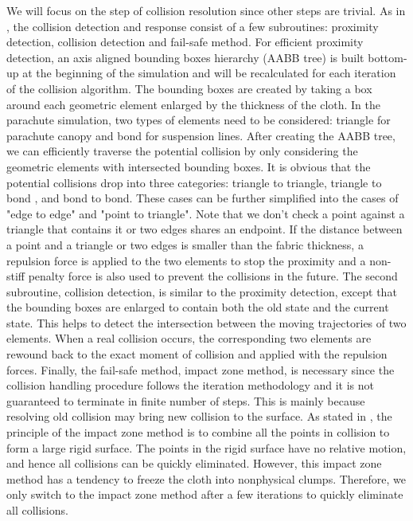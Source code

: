 We will focus on the step of collision resolution since other steps are trivial. As in \cite{Bridson02}, the collision detection and response consist of a few subroutines: proximity detection, collision detection and fail-safe method. For efficient proximity detection, an axis aligned bounding boxes hierarchy (AABB tree) is built bottom-up at the beginning of the simulation and will be recalculated for each iteration of the collision algorithm. The bounding boxes are created by taking a box around each geometric element enlarged by the thickness of the cloth. In the parachute simulation, two types of elements need to be considered: triangle for parachute canopy and bond for suspension lines. After creating the AABB tree, we can efficiently traverse the potential collision by only considering the geometric elements with intersected bounding boxes. It is obvious that the potential collisions drop into three categories: triangle to triangle, triangle to bond , and bond to bond. These cases can be further simplified into the cases of "edge to edge" and "point to triangle". Note that we don't check a point against a triangle that contains it or two edges shares an endpoint. If the distance between a point and a triangle or two edges is smaller than the fabric thickness, a repulsion force is applied to the two elements to stop the proximity and a non-stiff penalty force is also used to prevent the collisions in the future. The second subroutine, collision detection, is similar to the proximity detection, except that the bounding boxes are enlarged to contain both the old state and the current state. This helps to detect the intersection between the moving trajectories of two elements. When a real collision occurs, the corresponding two elements are rewound back to the exact moment of collision and applied with the repulsion forces. Finally, the fail-safe method, impact zone method, is necessary since the collision handling procedure follows the iteration methodology and it is not guaranteed to terminate in finite number of steps. This is mainly because resolving old collision may bring new collision to the surface. As stated in \cite{}, the principle of the impact zone method is to combine all the points in collision to form a large rigid surface. The points in the rigid surface have no relative motion, and hence all collisions can be quickly eliminated. However, this impact zone method has a tendency to freeze the cloth into nonphysical clumps. Therefore, we only switch to the impact zone method after a few iterations to quickly eliminate all collisions.

